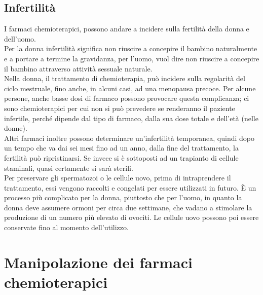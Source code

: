 \subsection{Infertilità}

I farmaci chemioterapici, possono andare a incidere sulla fertilità della donna e dell’uomo.\\ Per la donna infertilità 
significa non riuscire a concepire il bambino naturalmente e a portare a termine la gravidanza, 
per l’uomo, vuol dire non riuscire a concepire il bambino attraverso attività sessuale naturale\cite{AMERICANFERTILITY}.\\
Nella donna, il trattamento di chemioterapia, può incidere sulla regolarità del ciclo mestruale, fino anche, in alcuni casi, 
ad una menopausa precoce. Per alcune persone, anche basse dosi di farmaco possono provocare questa complicanza; 
ci sono chemioterapici per cui non si può prevedere se renderanno il paziente infertile, 
perché dipende dal tipo di farmaco, dalla sua dose totale e dell'età (nelle donne)\cite{UKFERTILITY}.\\
Altri farmaci inoltre possono determinare un'infertilità temporanea, quindi dopo un tempo che va dai sei mesi 
fino ad un anno, dalla fine del trattamento, la fertilità può ripristinarsi. 
Se invece si è sottoposti ad un trapianto di cellule staminali, quasi certamente si sarà sterili\cite{UKFERTILITY}.\\
Per preservare gli spermatozoi o le cellule uovo, prima di intraprendere il trattamento, essi vengono raccolti e 
congelati per essere utilizzati in futuro. È un processo più complicato per la donna, piuttosto che per l’uomo, 
in quanto la donna deve assumere ormoni per circa due settimane, che vadano a stimolare la produzione di un numero 
più elevato di ovociti. Le cellule uovo possono poi essere conservate fino al momento dell'utilizzo.

\section{Manipolazione dei farmaci chemioterapici}

